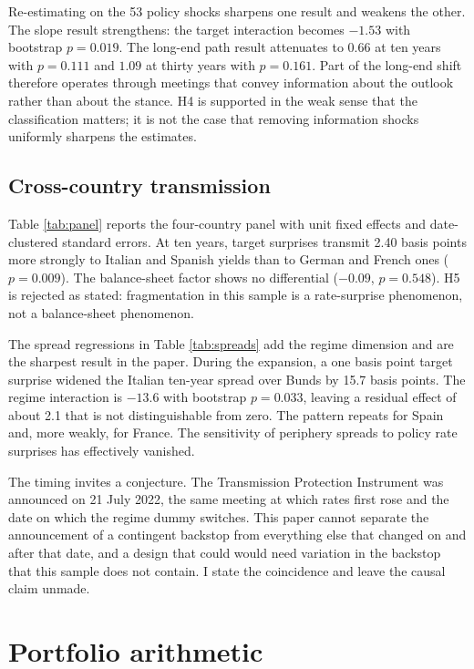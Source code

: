 \documentclass[11pt]{article}
\begin{document}
Re-estimating on the 53 policy shocks sharpens one result and weakens the other.
The slope result strengthens: the target interaction becomes $-1.53$ with
bootstrap $p = 0.019$. The long-end path result attenuates to $0.66$ at ten
years with $p = 0.111$ and $1.09$ at thirty years with $p = 0.161$. Part of the
long-end shift therefore operates through meetings that convey information about
the outlook rather than about the stance. H4 is supported in the weak sense that
the classification matters; it is not the case that removing information shocks
uniformly sharpens the estimates.

\subsection{Cross-country transmission}

Table \ref{tab:panel} reports the four-country panel with unit fixed effects and
date-clustered standard errors. At ten years, target surprises transmit 2.40
basis points more strongly to Italian and Spanish yields than to German and
French ones ($p = 0.009$). The balance-sheet factor shows no differential
($-0.09$, $p = 0.548$). H5 is rejected as stated: fragmentation in this sample is
a rate-surprise phenomenon, not a balance-sheet phenomenon.

The spread regressions in Table \ref{tab:spreads} add the regime dimension and
are the sharpest result in the paper. During the expansion, a one basis point
target surprise widened the Italian ten-year spread over Bunds by 15.7 basis
points. The regime interaction is $-13.6$ with bootstrap $p = 0.033$, leaving a
residual effect of about 2.1 that is not distinguishable from zero. The pattern
repeats for Spain and, more weakly, for France. The sensitivity of periphery
spreads to policy rate surprises has effectively vanished.

The timing invites a conjecture. The Transmission Protection Instrument was
announced on 21 July 2022, the same meeting at which rates first rose and the
date on which the regime dummy switches. This paper cannot separate the
announcement of a contingent backstop from everything else that changed on and
after that date, and a design that could would need variation in the backstop
that this sample does not contain. I state the coincidence and leave the causal
claim unmade.

\section{Portfolio arithmetic}
\label{sec:portfolio}
\end{document}
